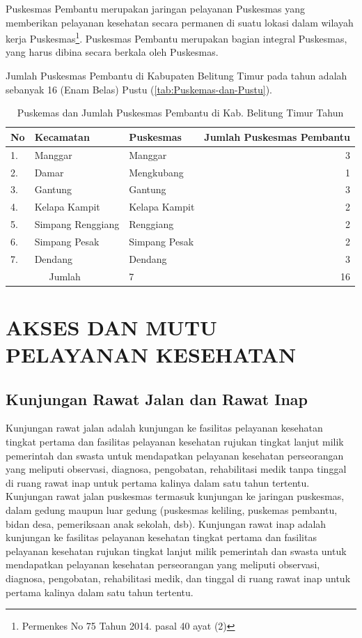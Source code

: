 Puskesmas Pembantu merupakan jaringan pelayanan Puskesmas yang memberikan pelayanan kesehatan secara permanen di suatu lokasi dalam wilayah kerja Puskesmas\footnote{Permenkes No 75 Tahun 2014. pasal 40 ayat (2)}. Puskesmas  Pembantu merupakan bagian integral  Puskesmas, yang harus dibina secara berkala oleh Puskesmas.

Jumlah Puskesmas Pembantu di Kabupaten Belitung Timur pada tahun \tP adalah sebanyak 16 (Enam Belas) Pustu (\autoref{tab:Puskemas-dan-Pustu}).

\begin{table}[!ht]
\caption{Puskemas dan Jumlah Puskesmas Pembantu di Kab. Belitung Timur Tahun \tP}
\label{tab:Puskemas-dan-Pustu}
\centering{}%

\begin{tabular}{lllr}
	\toprule
    No & Kecamatan & Puskesmas & Jumlah Puskesmas Pembantu\\
    \midrule
	1.                    & Manggar           & Manggar       & 3 \\
	\rowcolor{black!10}2. & Damar             & Mengkubang    & 1 \\
	3.                    & Gantung           & Gantung       & 3 \\
	\rowcolor{black!10}4. & Kelapa Kampit     & Kelapa Kampit & 2 \\
	5.                    & Simpang Renggiang & Renggiang     & 2 \\
	\rowcolor{black!10}6. & Simpang Pesak     & Simpang Pesak & 2 \\
	7.                    & Dendang           & Dendang       & 3 \\
    \midrule
    \multicolumn{2}{c}{Jumlah}                & 7             & 16\\
    \bottomrule
\end{tabular}
\end{table}

\section{AKSES DAN MUTU PELAYANAN KESEHATAN}
\subsection{Kunjungan Rawat Jalan dan Rawat Inap}
Kunjungan rawat jalan adalah kunjungan ke fasilitas pelayanan kesehatan tingkat pertama dan fasilitas pelayanan kesehatan rujukan tingkat lanjut milik pemerintah dan swasta untuk mendapatkan pelayanan kesehatan perseorangan yang meliputi observasi, diagnosa, pengobatan, rehabilitasi medik tanpa tinggal di ruang rawat inap untuk pertama kalinya dalam satu tahun tertentu. Kunjungan rawat jalan puskesmas termasuk kunjungan ke jaringan puskesmas, dalam gedung maupun luar gedung (puskesmas keliling, puskemas pembantu, bidan desa, pemeriksaan anak sekolah, dsb).
Kunjungan rawat inap adalah kunjungan ke fasilitas pelayanan kesehatan tingkat pertama dan fasilitas pelayanan kesehatan rujukan tingkat lanjut milik pemerintah dan swasta untuk mendapatkan pelayanan kesehatan perseorangan yang meliputi observasi, diagnosa, pengobatan, rehabilitasi medik, dan tinggal di ruang rawat inap untuk pertama kalinya dalam satu tahun tertentu.

